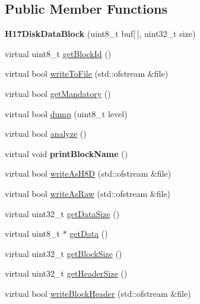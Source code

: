 \subsection*{Public Member Functions}
\begin{DoxyCompactItemize}
\item 
\hypertarget{classH17DiskDataBlock_a539b4d785f3b4395d9f47cbc131130fa}{}{\bfseries H17\+Disk\+Data\+Block} (uint8\+\_\+t buf\mbox{[}$\,$\mbox{]}, uint32\+\_\+t size)\label{classH17DiskDataBlock_a539b4d785f3b4395d9f47cbc131130fa}

\item 
virtual uint8\+\_\+t \hyperlink{classH17DiskDataBlock_a944cae8a6ba7b97a668654f787b908be}{get\+Block\+Id} ()
\item 
virtual bool \hyperlink{classH17DiskDataBlock_a6d7181e767bbc590cfee7c589c56930a}{write\+To\+File} (std\+::ofstream \&file)
\item 
virtual bool \hyperlink{classH17DiskDataBlock_a7a3764e8bc657aaf14e22ab92b63286d}{get\+Mandatory} ()
\item 
virtual bool \hyperlink{classH17DiskDataBlock_a6a940fded933fb4817c7b2b9dc7cea71}{dump} (uint8\+\_\+t level)
\item 
virtual bool \hyperlink{classH17DiskDataBlock_af03dbc5721ae46852aa286866959e45c}{analyze} ()
\item 
\hypertarget{classH17DiskDataBlock_ab7b123e3dc0d676b742c3730f4705f7d}{}virtual void {\bfseries print\+Block\+Name} ()\label{classH17DiskDataBlock_ab7b123e3dc0d676b742c3730f4705f7d}

\item 
virtual bool \hyperlink{classH17DiskDataBlock_ae78e78ea9f088f377b6de4fbec38b966}{write\+As\+H8\+D} (std\+::ofstream \&file)
\item 
virtual bool \hyperlink{classH17DiskDataBlock_a07b43b2694f0d89847b701d9c17f22f9}{write\+As\+Raw} (std\+::ofstream \&file)
\item 
virtual uint32\+\_\+t \hyperlink{classH17Block_aa2e87b141623b4c897c5337ea0535d1c}{get\+Data\+Size} ()
\item 
virtual uint8\+\_\+t $\ast$ \hyperlink{classH17Block_a6c2432cccdacdfb1a335bd924f19d942}{get\+Data} ()
\item 
virtual uint32\+\_\+t \hyperlink{classH17Block_a0327b6359cdf502269bbb7c6f35fae18}{get\+Block\+Size} ()
\item 
virtual uint32\+\_\+t \hyperlink{classH17Block_ad71ae203afc8713d4ee7416757fadbbe}{get\+Header\+Size} ()
\item 
virtual bool \hyperlink{classH17Block_a5c4d56a6c991c87fb9215797ce63b804}{write\+Block\+Header} (std\+::ofstream \&file)
\end{DoxyCompactItemize}
